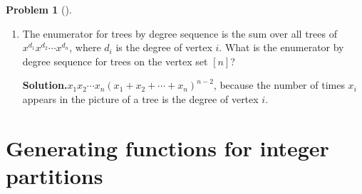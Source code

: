 \documentclass[10pt,]{book}
\theoremstyle{plain}
\theoremstyle{definition}
\newtheorem{activity}[project]{Problem}
\theoremstyle{definition}
\numberwithin{equation}{chapter}
\begin{document}
\begin{activity}[]
\begin{enumerate}[font=\bfseries,label=(\alph*),ref=\alph*]
\item\label{task-134} The enumerator for trees by degree sequence is the sum over all trees of \(x^{d_1}x^{d_2} \cdots x^{d_n}\), where \(d_i\) is the degree of vertex \(i\). What is the enumerator by degree sequence for trees on the vertex set \([n]\)?%
\par\medskip\noindent%
\textbf{Solution.}\quad \(x_1x_2 \cdots x_n(x_1+x_2+\cdots +x_n)^{n-2}\), because the number of times \(x_i\) appears in the picture of a tree is the degree of vertex \(i\).%
\end{enumerate}
\end{activity}
\typeout{************************************************}
\typeout{************************************************}
\section[{Generating functions for integer partitions}]{Generating functions for integer partitions}\label{sec_genfns-int-parts}
\end{document}
